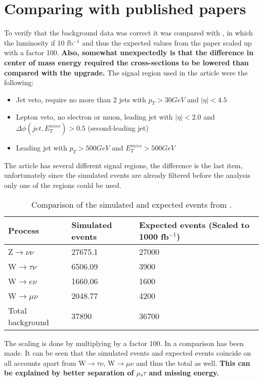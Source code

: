 \section{Comparing with published papers} 	
To verify that the background data was correct it was compared with \citep{ATLAS-CONF-2012-147}, in which the luminosity if 10 fb$^{-1}$ and thus the expected values from the paper scaled up with a factor 100. \textbf{Also, somewhat unexpectedly is that the difference in center of mass energy required the cross-sections to be lowered than compared with the upgrade.} The signal region used in the article were the following:
\begin{itemize}
\item Jet veto, require no more than 2 jets with $p_T > 30 GeV$ and $|\eta| < 4.5$
\item Lepton veto, no electron or muon, leading jet with $|\eta| < 2.0$ and $\Delta \phi (jet, E_T^{miss})>0.5$ (second-leading jet)
\item Leading jet with $p_T > 500 GeV$ and $E_T^{miss}>500 GeV$
\end{itemize}
The article has several different signal regions, the difference is the last item, unfortunately since the simulated events are already filtered before the analysis only one of the regions could be used.
\begin{table}[ht]
\begin{center}
\begin{tabular}{|l|l|l|}
\hline
Process & Simulated events & Expected events (Scaled to 1000 fb$^{-1}$) \\ \hline
Z$\rightarrow\nu\nu$&27675.1&27000 \\
W$\rightarrow\tau\nu$&6506.09&3900 \\
W$\rightarrow e\nu$&1660.06&1600 \\
W$\rightarrow\mu\nu$&2048.77&4200 \\ \hline
Total background&37890&36700 \\ \hline
\end{tabular}
\caption{Comparison of the simulated and expected events from \citep{ATLAS-CONF-2012-147}.}
\label{tab:Compare1}
\end{center}
\end{table}

The scaling is done by multiplying by a factor 100.
In  a comparison has been made. It can be seen that the simulated events and expected events coincide on all accounts apart from W$\rightarrow\tau\nu$, W$\rightarrow\mu\nu$ and thus the total as well. \textbf{This can be explained by better separation of $\mu$,$\tau$ and missing energy.} 


